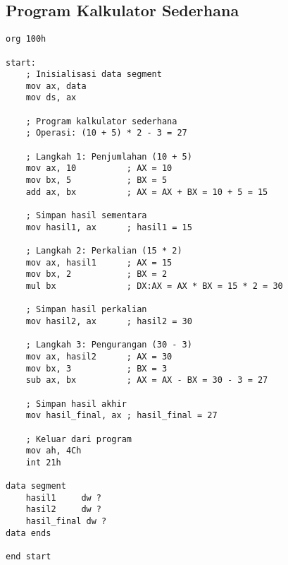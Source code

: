 \documentclass[../main.tex]{subfiles}
\begin{document}
        \subsection{Program Kalkulator Sederhana}
            \begin{lstlisting}[language={[x86masm]Assembler}, caption=Program Kalkulator Sederhana, label={lst:calculator-program}]
org 100h

start:
    ; Inisialisasi data segment
    mov ax, data
    mov ds, ax
    
    ; Program kalkulator sederhana
    ; Operasi: (10 + 5) * 2 - 3 = 27
    
    ; Langkah 1: Penjumlahan (10 + 5)
    mov ax, 10          ; AX = 10
    mov bx, 5           ; BX = 5
    add ax, bx          ; AX = AX + BX = 10 + 5 = 15
    
    ; Simpan hasil sementara
    mov hasil1, ax      ; hasil1 = 15
    
    ; Langkah 2: Perkalian (15 * 2)
    mov ax, hasil1      ; AX = 15
    mov bx, 2           ; BX = 2
    mul bx              ; DX:AX = AX * BX = 15 * 2 = 30
    
    ; Simpan hasil perkalian
    mov hasil2, ax      ; hasil2 = 30
    
    ; Langkah 3: Pengurangan (30 - 3)
    mov ax, hasil2      ; AX = 30
    mov bx, 3           ; BX = 3
    sub ax, bx          ; AX = AX - BX = 30 - 3 = 27
    
    ; Simpan hasil akhir
    mov hasil_final, ax ; hasil_final = 27
    
    ; Keluar dari program
    mov ah, 4Ch
    int 21h

data segment
    hasil1     dw ?
    hasil2     dw ?
    hasil_final dw ?
data ends

end start
            \end{lstlisting}
\end{document}
